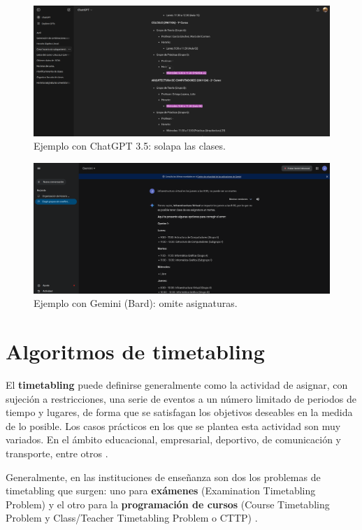 \begin{figure}[H]
    \centering
    \includegraphics[width=1\textwidth]{./imagenes/ChatGPT.png}
    \caption{Ejemplo con ChatGPT 3.5: solapa las clases.}
    \label{fig:chatgpt}
\end{figure}

\begin{figure}[H]
    \centering
    \includegraphics[width=1\textwidth]{./imagenes/Gemini.png}
    \caption{Ejemplo con Gemini (Bard): omite asignaturas.}
    \label{fig:gemini}
\end{figure}

\section{Algoritmos de timetabling}

El \textbf{timetabling} puede definirse generalmente como la actividad de asignar, con sujeción a restricciones, una serie de eventos a un número limitado de periodos de tiempo y lugares, de forma que se satisfagan los objetivos deseables en la medida de lo posible. Los casos prácticos en los que se plantea esta actividad son muy variados. En el ámbito educacional, empresarial, deportivo, de comunicación y transporte, entre otros \cite{hybrid-timetabling}.\newpage

Generalmente, en las instituciones de enseñanza son dos los problemas de timetabling que surgen: uno para \textbf{exámenes} (Examination Timetabling Problem) y el otro para la \textbf{programación de cursos} (Course Timetabling Problem y Class/Teacher Timetabling Problem o CTTP) \cite{carter}.\newline

